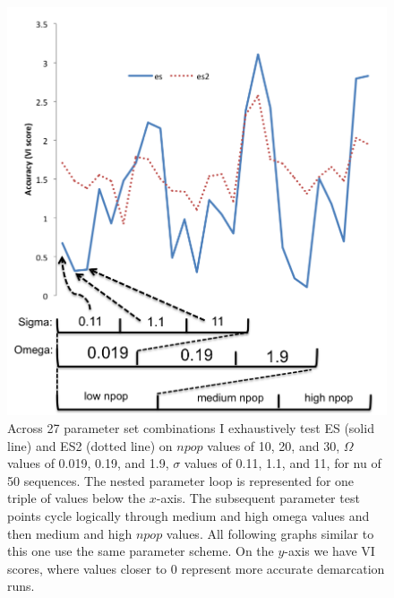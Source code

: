 \begin{figure}[h!]
  \centering
    \includegraphics[scale=0.75]{images/ResultGraphs/ResultGraphs-4}
      \caption[ES vs ES2 accuracy visualization on $nu = 50$.]{Across 27 parameter set combinations I exhaustively test ES (solid line) and ES2 (dotted line) on $npop$ values of 10, 20, and 30, $\Omega$ values of 0.019, 0.19, and 1.9, $\sigma$ values of 0.11, 1.1, and 11, for nu of 50 sequences. The nested parameter loop is represented for one triple of values below the $x$-axis. The subsequent parameter test points cycle logically through medium and high omega values and then medium and high $npop$ values. All following graphs similar to this one use the same parameter scheme. On the $y$-axis we have VI scores, where values closer to 0 represent more accurate demarcation runs.}
    \label{fig:ESvES2}
\end{figure}


